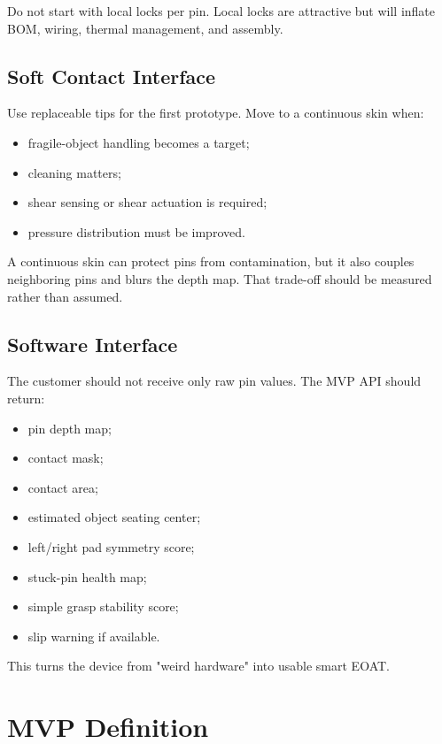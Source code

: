 \documentclass[11pt]{article}
\begin{document}
Do not start with local locks per pin. Local locks are attractive but will inflate BOM, wiring, thermal management, and assembly.

\subsection{Soft Contact Interface}

Use replaceable tips for the first prototype. Move to a continuous skin when:

\begin{itemize}[leftmargin=*]
  \item fragile-object handling becomes a target;
  \item cleaning matters;
  \item shear sensing or shear actuation is required;
  \item pressure distribution must be improved.
\end{itemize}

A continuous skin can protect pins from contamination, but it also couples neighboring pins and blurs the depth map. That trade-off should be measured rather than assumed.

\subsection{Software Interface}

The customer should not receive only raw pin values. The MVP API should return:

\begin{itemize}[leftmargin=*]
  \item pin depth map;
  \item contact mask;
  \item contact area;
  \item estimated object seating center;
  \item left/right pad symmetry score;
  \item stuck-pin health map;
  \item simple grasp stability score;
  \item slip warning if available.
\end{itemize}

This turns the device from "weird hardware" into usable smart EOAT.

\section{MVP Definition}
\end{document}
